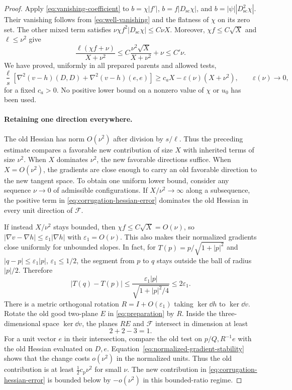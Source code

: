 \begin{proof}
Apply \eqref{eq:vanishing-coefficient} to
$b=\chi|f'|$, $b=f|D_{\mathrm{sc}}\chi|$, and
$b=|\psi||D_{\mathrm{sc}}^2\chi|$.  Their vanishing follows from
\eqref{eq:well-vanishing} and the flatness of $\chi$ on its zero
set.  The other mixed term satisfies
$\nu\chi f^2|D_{\mathrm{sc}}\chi|\le C\nu X$.
Moreover, $\chi f\le C\sqrt X$ and $\ell\le\nu^2$ give
\[
 \frac{\ell(\chi f+\nu)}{X+\nu^2}
 \le C\frac{\nu^2\sqrt X}{X+\nu^2}+\nu
 \le C'\nu.
\]
We have proved, uniformly in all prepared parents and allowed tests,
\begin{equation}\label{eq:corrugation-hessian-error}
 \frac{\ell}{s}\left[
  \nabla^2(v-h)(D,D)+\nabla^2(v-h)(e,e)\right]
 \ge c_a X-\varepsilon(\nu)(X+\nu^2),
 \qquad \varepsilon(\nu)\longrightarrow0,
\end{equation}
for a fixed $c_a>0$.  No positive lower bound on a nonzero value of
$\chi$ or $u_0$ has been used.

\paragraph{Retaining one direction everywhere.}
The old Hessian has norm $O(\nu^2)$ after division by $s/\ell$.
Thus the preceding estimate compares a favorable new contribution of
size $X$ with inherited terms of size $\nu^2$.  When $X$ dominates
$\nu^2$, the new favorable directions suffice.  When $X=O(\nu^2)$,
the gradients are close enough to carry an old favorable direction to
the new tangent space.  To obtain one uniform lower bound, consider
any sequence $\nu\to0$ of admissible configurations.
If $X/\nu^2\to\infty$ along a subsequence, the positive term in
\eqref{eq:corrugation-hessian-error} dominates the old Hessian in
every unit direction of $\mathcal F$.

If instead $X/\nu^2$ stays bounded, then
$\chi f\le C\sqrt X=O(\nu)$, so
$|\nabla v-\nabla h|\le\varepsilon_1|\nabla h|$ with
$\varepsilon_1=O(\nu)$.  This also makes their normalized gradients
close uniformly for unbounded slopes.  In fact, for
$T(p)=p/\sqrt{1+|p|^2}$ and $|q-p|\le\varepsilon_1|p|$,
$\varepsilon_1\le1/2$, the segment from $p$ to $q$ stays outside
the ball of radius $|p|/2$.  Therefore
\begin{equation}\label{eq:normalized-gradient-stability}
 |T(q)-T(p)|
 \le\frac{\varepsilon_1|p|}{\sqrt{1+|p|^2/4}}
 \le2\varepsilon_1.
\end{equation}
There is a metric orthogonal rotation $R=I+O(\varepsilon_1)$ taking
$\ker\dd h$ to $\ker\dd v$.  Rotate the old good two-plane $E$
in \eqref{eq:preparation} by $R$.  Inside the three-dimensional
space $\ker\dd v$, the planes $RE$ and $\mathcal F$ intersect in
dimension at least
\[
 2+2-3=1.
\]
For a unit vector $e$ in their intersection, compare the old test on
$p/Q,R^{-1}e$ with the old Hessian evaluated on $D,e$.
Equation~\eqref{eq:normalized-gradient-stability} shows that the
change costs $o(\nu^2)$ in the normalized units.  Thus the old
contribution is at least $\tfrac12c_{\mathrm p}\nu^2$ for small
$\nu$.  The new contribution in
\eqref{eq:corrugation-hessian-error} is bounded below by
$-o(\nu^2)$ in this bounded-ratio regime.


\end{proof}
